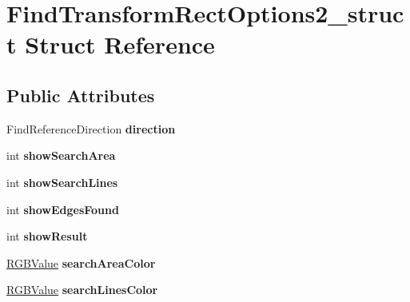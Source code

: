 \hypertarget{structFindTransformRectOptions2__struct}{
\section{FindTransformRectOptions2\_\-struct Struct Reference}
\label{structFindTransformRectOptions2__struct}
}
\subsection*{Public Attributes}
\begin{DoxyCompactItemize}
\item 
\hypertarget{structFindTransformRectOptions2__struct_a3e3e4bb9c703b0fcfe1ac9af7f8a1f45}{
FindReferenceDirection {\bfseries direction}}
\label{structFindTransformRectOptions2__struct_a3e3e4bb9c703b0fcfe1ac9af7f8a1f45}

\item 
\hypertarget{structFindTransformRectOptions2__struct_abea00c15d53280992cd2b62cbf9c0345}{
int {\bfseries showSearchArea}}
\label{structFindTransformRectOptions2__struct_abea00c15d53280992cd2b62cbf9c0345}

\item 
\hypertarget{structFindTransformRectOptions2__struct_a66015c6d70cb3bade582888561e61f8f}{
int {\bfseries showSearchLines}}
\label{structFindTransformRectOptions2__struct_a66015c6d70cb3bade582888561e61f8f}

\item 
\hypertarget{structFindTransformRectOptions2__struct_ac9f0f586ecc53a4652ec2509e85f2d8e}{
int {\bfseries showEdgesFound}}
\label{structFindTransformRectOptions2__struct_ac9f0f586ecc53a4652ec2509e85f2d8e}

\item 
\hypertarget{structFindTransformRectOptions2__struct_ac8303bb79ab62a38ed1900577884c11b}{
int {\bfseries showResult}}
\label{structFindTransformRectOptions2__struct_ac8303bb79ab62a38ed1900577884c11b}

\item 
\hypertarget{structFindTransformRectOptions2__struct_a74b65456477c974efbc45fed5fd11796}{
\hyperlink{structRGBValue__struct}{RGBValue} {\bfseries searchAreaColor}}
\label{structFindTransformRectOptions2__struct_a74b65456477c974efbc45fed5fd11796}

\item 
\hypertarget{structFindTransformRectOptions2__struct_acbf10ce746d0670b931eea8ca4ec995a}{
\hyperlink{structRGBValue__struct}{RGBValue} {\bfseries searchLinesColor}}
\label{structFindTransformRectOptions2__struct_acbf10ce746d0670b931eea8ca4ec995a}


\end{DoxyCompactItemize}
